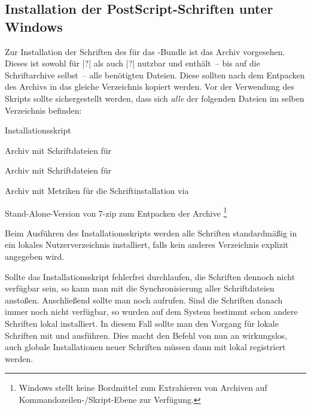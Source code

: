 \subsection{Installation der PostScript-Schriften unter Windows}
\label{sec:install:fonts:win}
%
%
Zur Installation der Schriften des \CDs für das \TUDScript-Bundle ist das Archiv
%
{} vorgesehen. Dieses ist sowohl für 
|?| als auch |?| 
nutzbar und enthält~-- bis auf die Schriftarchive selbst~-- alle benötigten 
Dateien. Diese sollten nach dem Entpacken des Archivs in das gleiche 
Verzeichnis kopiert werden. Vor der Verwendung des Skripts 
 sollte sichergestellt werden, dass sich 
\emph{alle} der folgenden Dateien im selben Verzeichnis befinden:
%
\settowidth{}%
\begin{description}[labelwidth=\tempdim,labelsep=1em]
  \item[\File{tudscrfonts\_install.bat}]Installationsskript
  \item[\File{Univers\_PS.zip}]Archiv mit Schriftdateien für \Univers
  \item[\File{DIN\_Bd\_PS.zip}]Archiv mit Schriftdateien für \DIN
  \item[\File{tudscrfonts.zip}]Archiv mit Metriken für die
    Schriftinstallation via 
  \item[\File{7za.exe}]Stand-Alone-Version von 7-zip zum Entpacken der Archive%
    \footnote{%
      Windows stellt keine Bordmittel zum Extrahieren von Archiven auf 
      Kommandozeilen-/Skript-Ebene zur Verfügung.%
    }%
\end{description}
%
Beim Ausführen des Installationsskripts werden alle Schriften standardmäßig in 
ein lokales Nutzerverzeichnis installiert, falls kein anderes Verzeichnis 
explizit angegeben wird.

Sollte das Installationsskript fehlerfrei durchlaufen, die Schriften dennoch 
nicht verfügbar sein, so kann man mit  
die Synchronisierung aller Schriftdateien anstoßen. Anschließend sollte man 
noch  aufrufen. Sind die Schriften danach immer noch 
nicht verfügbar, so wurden auf dem System bestimmt schon andere Schriften lokal 
installiert. In diesem Fall sollte man den Vorgang für lokale Schriften mit 
 und  ausführen. Dies 
macht den Befehl  von nun an wirkungslos, auch globale 
Installationen neuer Schriften müssen dann mit  lokal registriert 
werden.

